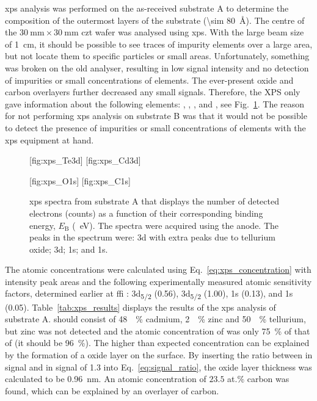 \Ac{xps} analysis was performed on the as-received substrate A to determine the composition of the outermost layers of the substrate (\SI{\sim 80}{\angstrom}). The centre of the $\SI{30}{\milli\metre}\times\SI{30}{\milli\metre}$ \ac{czt} wafer was analysed using \ac{xps}. With the large beam size of \SI{1}{\centi\metre}, it should be possible to see traces of impurity elements over a large area, but not locate them to specific particles or small areas. Unfortunately, something was broken on the old analyser, resulting in low signal intensity and no detection of impurities or small concentrations of elements. The ever-present oxide and carbon overlayers further decreased any small signals. Therefore, the XPS only gave information about the following elements: , , , and , see Fig.~\ref{fig:xps_spectra}. The reason for not performing \ac{xps} analysis on substrate B was that it would not be possible to detect the presence of impurities or small concentrations of elements with the \ac{xps} equipment at hand.

\begin{figure}[htbp]
    \centering
    [fig:xps_Te3d]
    \hfill
    [fig:xps_Cd3d]
    \par\bigskip
    [fig:xps_O1s]
    \hfill
    [fig:xps_C1s]
    \caption[\Ac{xps} spectra from substrate A.]{\Ac{xps} spectra from substrate A that displays the number of detected electrons (counts) as a function of their corresponding binding energy, $E_\mathrm{B}$ (\SI{}{\electronvolt}). The spectra were acquired using the  anode. The peaks in the spectrum were:   3d with extra peaks due to tellurium oxide;   3d;   1s; and   1s.}
    \label{fig:xps_spectra}
\end{figure}
 
The atomic concentrations were calculated using Eq.~\eqref{eq:xps_concentration} with intensity peak areas and the following experimentally measured atomic sensitivity factors, determined earlier at \ac{ffi} \citep{hirsch1999x-ray}:  3d\textsubscript{5/2} (0.56),  3d\textsubscript{5/2} (1.00),  1s (0.13), and  1s (0.05). Table~\ref{tab:xps_results} displays the results of the \ac{xps} analysis of substrate A.  should consist of \SI{48}{\atomic\percent} cadmium, \SI{2}{\atomic\percent} zinc and \SI{50}{\atomic\percent} tellurium, but zinc was not detected and the atomic concentration of  was only \SI{75}{\percent} of that of  (it should be \SI{96}{\percent}). The higher than expected  concentration can be explained by the formation of a  oxide layer on the surface. By inserting the ratio between  in  signal and  in  signal of \SI{1.3}{} into Eq.~\eqref{eq:signal_ratio}, the  oxide layer thickness was calculated to be \SI{0.96}{\nano\metre}. An atomic concentration of $23.5$ at.\% carbon was found, which can be explained by an overlayer of carbon. 

